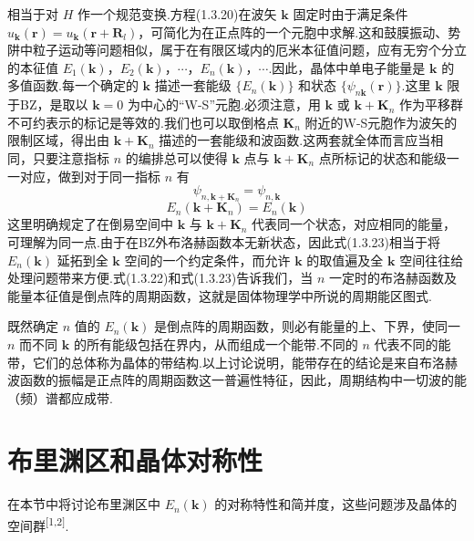 相当于对 $H$ 作一个规范变换.方程(1.3.20)在波矢 $\boldsymbol{k}$ 固定时由于满足条件 $u_{\boldsymbol{k}}(\boldsymbol{r})=u_{\boldsymbol{k}}(\boldsymbol{r}+\boldsymbol{R}_l)$，可简化为在正点阵的一个元胞中求解.这和鼓膜振动、势阱中粒子运动等问题相似，属于在有限区域内的厄米本征值问题，应有无穷个分立的本征值 $E_1(\boldsymbol{k})$，$E_2(\boldsymbol{k})$，$\cdots$，$E_n(\boldsymbol{k})$，$\cdots$.因此，晶体中单电子能量是 $\boldsymbol{k}$ 的多值函数.每一个确定的 $\boldsymbol{k}$ 描述一套能级 $\{E_n(\boldsymbol{k})\}$ 和状态 $\{\psi_{n\boldsymbol{k}}(\boldsymbol{r})\}$.这里 $\boldsymbol{k}$ 限于BZ，是取以 $\boldsymbol{k}=0$ 为中心的“W-S”元胞.必须注意，用 $\boldsymbol{k}$ 或 $\boldsymbol{k}+\boldsymbol{K}_n$ 作为平移群不可约表示的标记是等效的.我们也可以取倒格点 $\boldsymbol{K}_n$ 附近的W-S元胞作为波矢的限制区域，得出由 $\boldsymbol{k}+\boldsymbol{K}_n$ 描述的一套能级和波函数.这两套就全体而言应当相同，只要注意指标 $n$ 的编排总可以使得 $\boldsymbol{k}$ 点与 $\boldsymbol{k}+\boldsymbol{K}_n$ 点所标记的状态和能级一一对应，做到对于同一指标 $n$ 有
\begin{equation}
  \psi_{n,\boldsymbol{k}+\boldsymbol{K}_n}=\psi_{n,\boldsymbol{k}}
\end{equation}
\begin{equation}
  E_n(\boldsymbol{k}+\boldsymbol{K}_n)=E_n(\boldsymbol{k})
\end{equation}
这里明确规定了在倒易空间中 $\boldsymbol{k}$ 与 $\boldsymbol{k}+\boldsymbol{K}_n$ 代表同一个状态，对应相同的能量，可理解为同一点.由于在BZ外布洛赫函数本无新状态，因此式(1.3.23)相当于将 $E_n(\boldsymbol{k})$ 延拓到全 $\boldsymbol{k}$ 空间的一个约定条件，而允许 $\boldsymbol{k}$ 的取值遍及全 $\boldsymbol{k}$ 空间往往给处理问题带来方便.式(1.3.22)和式(1.3.23)告诉我们，当 $n$ 一定时的布洛赫函数及能量本征值是倒点阵的周期函数，这就是固体物理学中所说的周期能区图式.

既然确定 $n$ 值的 $E_n(\boldsymbol{k})$ 是倒点阵的周期函数，则必有能量的上、下界，使同一 $n$ 而不同 $\boldsymbol{k}$ 的所有能级包括在界内，从而组成一个能带.不同的 $n$ 代表不同的能带，它们的总体称为晶体的带结构.以上讨论说明，能带存在的结论是来自布洛赫波函数的振幅是正点阵的周期函数这一普遍性特征，因此，周期结构中一切波的能（频）谱都应成带.

\section{布里渊区和晶体对称性}

在本节中将讨论布里渊区中 $E_n(\boldsymbol{k})$ 的对称特性和简并度，这些问题涉及晶体的空间群\textsuperscript{[1,2]}.


